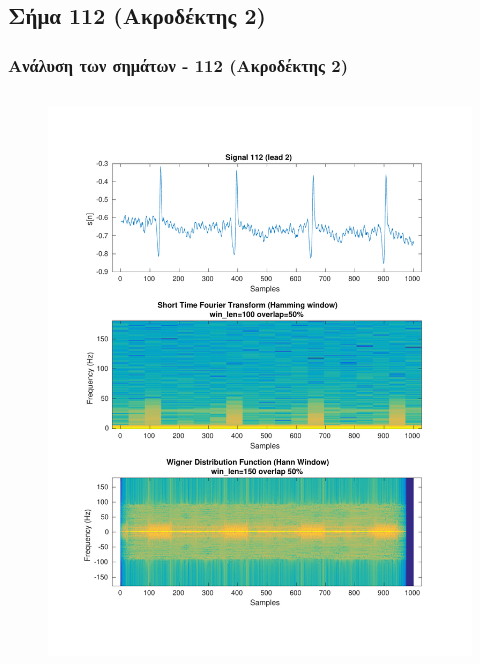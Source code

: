 \documentclass{beamer}
\begin{document}
\subsection{Σήμα 112 (Ακροδέκτης 2)}
\label{sig:112l2}
\begin{frame}
\frametitle{Ανάλυση των σημάτων - 112 (Ακροδέκτης 2)}

\begin{columns}
\begin{figure}
\includegraphics[width=\textwidth]{fig/112l2_stft_wdf.pdf}
\end{figure}


\end{columns}
\end{frame}
\end{document}
